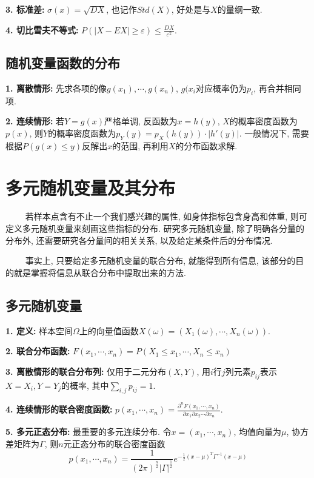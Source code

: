 \textbf{3. 标准差: }$\sigma(x)=\sqrt{DX}$, 也记作$Std(X)$, 好处是与$X$的量纲一致.

\textbf{4. 切比雪夫不等式: }$P(|X-EX|\geq \varepsilon)\leq \frac{DX}{\varepsilon^2}$.

\subsection{随机变量函数的分布}

\textbf{1. 离散情形: }先求各项的像$g(x_1),\cdots, g(x_n)$, $g(x_i$对应概率仍为$p_i$, 再合并相同项.

\textbf{2. 连续情形: }若$Y=g(x)$严格单调, 反函数为$x=h(y)$, $X$的概率密度函数为$p(x)$, 则$Y$的概率密度函数为$p_Y(y)=p_X(h(y)) \cdot |h'(y)|$.
一般情况下, 需要根据$P(g(x)\leq y)$反解出$x$的范围, 再利用$X$的分布函数求解.

\section{多元随机变量及其分布}

\begin{tcolorbox}[colback=red!5,colframe=red!75!black]
    ~~~~ 若样本点含有不止一个我们感兴趣的属性, 如身体指标包含身高和体重, 则可定义多元随机变量来刻画这些指标的分布. 研究多元随机变量, 除了明确各分量的分布外, 还需要研究各分量间的相关关系, 以及给定某条件后的分布情况. 
    
    ~~~~ 事实上, 只要给定多元随机变量的联合分布, 就能得到所有信息, 该部分的目的就是掌握将信息从联合分布中提取出来的方法.
\end{tcolorbox}

\subsection{多元随机变量}

\textbf{1. 定义: }样本空间$\Omega$上的向量值函数$X(\omega)=(X_1(\omega),\cdots,X_n(\omega))$.

\textbf{2. 联合分布函数: }$F(x_1,\cdots, x_n)=P(X_1\leq x_1, \cdots, X_n \leq x_n)$

\textbf{3. 离散情形的联合分布列: }仅用于二元分布$(X,Y)$, 用$i$行$j$列元素$p_{ij}$表示$X=X_i,Y=Y_j$的概率, 其中$\sum\limits_{i,j}p_{ij}=1$.

\textbf{4. 连续情形的联合密度函数: }$p(x_1,\cdots, x_n)=\frac{\partial^nF(x_1,\cdots,x_n)}{\partial x_1\partial x_2 \cdots \partial x_n}$.

\textbf{5. 多元正态分布: }最重要的多元连续分布. 令$x=(x_1,\cdots,x_n)$, 均值向量为$\mu$, 协方差矩阵为$\Gamma$, 则$n$元正态分布的联合密度函数
\begin{equation*}
    p(x_1,\cdots,x_n)=\frac{1}{(2\pi)^\frac{n}{2}|\Gamma|^\frac{1}{2}}e^{-\frac{1}{2}(x-\mu)^T\Gamma^{-1}(x-\mu)}
\end{equation*}

